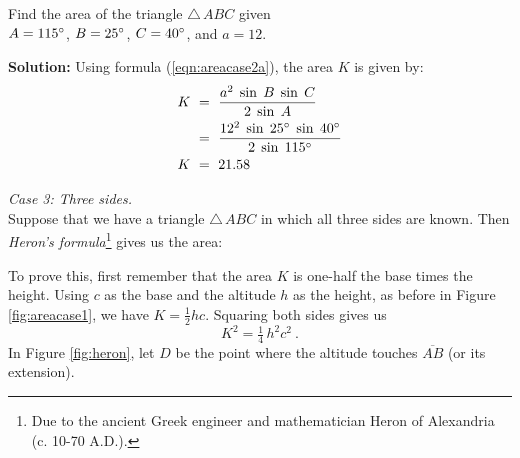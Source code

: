 \begin{exmp}\label{exmp:areacase2}
\noindent Find the area of the triangle $\triangle\,ABC$ given\\$A = 115^\circ$, $B=25^\circ$,
 $C=40^\circ$, and $a = 12$.\vspace{1mm}
 \par\noindent\textbf{Solution:} Using formula (\ref{eqn:areacase2a}), the area $K$ is given by:
 \begin{align*}
  K ~&=~ \frac{a^2 \;\sin\;B \;\sin\;C}{2\;\sin\;A}\\
   &=~ \frac{12^2 \;\sin\;25^\circ \;\sin\;40^\circ}{2\;\sin\;115^\circ}\\
  K ~&=~ 21.58
 \end{align*}
\end{exmp}\vspace{-2mm}
\divider
\vspace{2mm}

\noindent\emph{Case 3: Three sides.}\\Suppose that we have a triangle $\triangle\,ABC$ in which all
three sides are known. Then \emph{Heron's formula}\footnote{Due to the ancient Greek engineer and
mathematician Heron of Alexandria (c. 10-70 A.D.).} gives us the area:

\begin{center}\end{center}

To prove this, first remember that the area $K$ is one-half the base times the height. Using $c$ as
the base and the altitude $h$ as the height, as before in Figure \ref{fig:areacase1}, we have
$K = \frac{1}{2}hc$. Squaring both sides gives us
\begin{equation}\label{eqn:heronproof1}
 K^2 = \tfrac{1}{4}\,h^2 c^2 ~.
\end{equation}
\newpage
In Figure \ref{fig:heron}, let $D$ be the point where the altitude touches $\overline{AB}$ (or its
extension).

